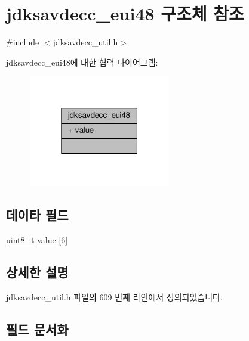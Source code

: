 \hypertarget{structjdksavdecc__eui48}{}\section{jdksavdecc\+\_\+eui48 구조체 참조}
\label{structjdksavdecc__eui48}


{\ttfamily \#include $<$jdksavdecc\+\_\+util.\+h$>$}



jdksavdecc\+\_\+eui48에 대한 협력 다이어그램\+:
\nopagebreak
\begin{figure}[H]
\begin{center}
\leavevmode
\includegraphics[width=175pt]{structjdksavdecc__eui48__coll__graph}
\end{center}
\end{figure}
\subsection*{데이타 필드}
\begin{DoxyCompactItemize}
\item 
\hyperlink{stdint_8h_aba7bc1797add20fe3efdf37ced1182c5}{uint8\+\_\+t} \hyperlink{structjdksavdecc__eui48_a18b93f04637cf37688ec10a33a0cbc26}{value} \mbox{[}6\mbox{]}
\end{DoxyCompactItemize}


\subsection{상세한 설명}


jdksavdecc\+\_\+util.\+h 파일의 609 번째 라인에서 정의되었습니다.



\subsection{필드 문서화}
